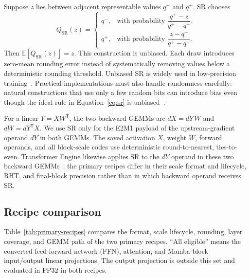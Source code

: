 \documentclass[11pt]{article}
\begin{document}
Suppose $z$ lies between adjacent representable values $q^-$ and $q^+$.  SR
chooses
\begin{equation}
  Q_{\mathrm{SR}}(z)=
  \begin{cases}
    q^-, & \text{with probability } \dfrac{q^+-z}{q^+-q^-},\\[6pt]
    q^+, & \text{with probability } \dfrac{z-q^-}{q^+-q^-}.
  \end{cases}
  \label{eq:sr}
\end{equation}
Then $\mathbb{E}[Q_{\mathrm{SR}}(z)]=z$.  This construction is unbiased.  Each
draw introduces zero-mean rounding error instead of systematically removing
values below a deterministic rounding threshold.  Unbiased SR is widely used
in low-precision training~\citep{gupta2015limited,ozkara2025sr}.  Practical
implementations must also handle randomness carefully: natural constructions
that use only a few random bits can introduce bias even though the ideal rule
in Equation~\ref{eq:sr} is unbiased~\citep{fitzgibbon2025fewbits}.

For a linear $Y=XW^{\mathsf T}$, the two backward GEMMs are
$dX=dY\,W$ and $dW=dY^{\mathsf T}X$.  We use SR only for the E2M1 payload of
the upstream-gradient operand $dY$ in both GEMMs.  The saved activation $X$,
weight $W$, forward operands, and all block-scale codes use deterministic
round-to-nearest, ties-to-even.  Transformer Engine likewise applies SR to the
$dY$ operand in these two backward GEMMs~\citep{nvidia2025nvfp4,nvidia2026tedocs};
the primary recipes differ in their scale format and lifecycle, RHT, and
final-block precision rather than in which backward operand receives SR.

\subsection{Recipe comparison}

Table~\ref{tab:primary-recipes} compares the format, scale lifecycle, rounding,
layer coverage, and GEMM path of the two primary recipes.  ``All eligible''
means the converted feed-forward-network (FFN), attention, and Mamba-block
input/output linear projections.  The output projection is outside this set
and evaluated in FP32 in both recipes.
\end{document}
